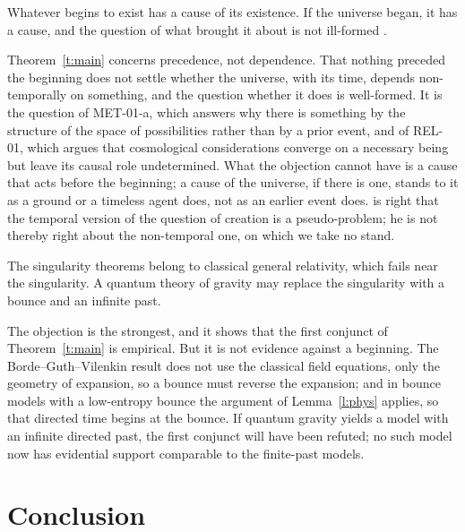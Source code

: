 \documentclass{situationist-preprint}
\begin{document}
\begin{objection}\label{o:kalam}
Whatever begins to exist has a cause of its existence. If the universe began, it has a cause, and the question of what brought it about is not ill-formed \citep{Craig1979}.
\end{objection}

\begin{reply}
Theorem~\ref{t:main} concerns precedence, not dependence. That nothing preceded the beginning does not settle whether the universe, with its time, depends non-temporally on something, and the question whether it does is well-formed. It is the question of MET-01-a, which answers why there is something by the structure of the space of possibilities rather than by a prior event, and of REL-01, which argues that cosmological considerations converge on a necessary being but leave its causal role undetermined. What the objection cannot have is a cause that acts before the beginning; a cause of the universe, if there is one, stands to it as a ground or a timeless agent does, not as an earlier event does. \citet{Grunbaum1989} is right that the temporal version of the question of creation is a pseudo-problem; he is not thereby right about the non-temporal one, on which we take no stand.
\end{reply}

\begin{objection}\label{o:qg}
The singularity theorems belong to classical general relativity, which fails near the singularity. A quantum theory of gravity may replace the singularity with a bounce and an infinite past.
\end{objection}

\begin{reply}
The objection is the strongest, and it shows that the first conjunct of Theorem~\ref{t:main} is empirical. But it is not evidence against a beginning. The Borde--Guth--Vilenkin result does not use the classical field equations, only the geometry of expansion, so a bounce must reverse the expansion; and in bounce models with a low-entropy bounce the argument of Lemma~\ref{l:phys} applies, so that directed time begins at the bounce. If quantum gravity yields a model with an infinite directed past, the first conjunct will have been refuted; no such model now has evidential support comparable to the finite-past models.
\end{reply}

\section{Conclusion}
\end{document}
